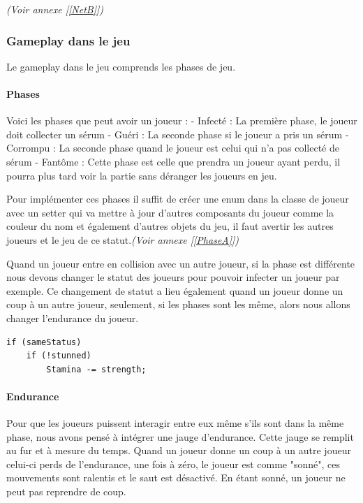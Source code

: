 \documentclass{article}
\begin{document}
\emph{(Voir annexe [\ref{NetB}])}

\newpage
\subsubsection{Gameplay dans le jeu}

Le gameplay dans le jeu comprends les phases de jeu.

\paragraph{Phases}

Voici les phases que peut avoir un joueur :
- Infecté : La première phase, le joueur doit collecter un sérum
- Guéri : La seconde phase si le joueur a pris un sérum
- Corrompu : La seconde phase quand le joueur est celui qui n'a pas collecté de sérum
- Fantôme : Cette phase est celle que prendra un joueur ayant perdu, il pourra plus tard voir la partie sans déranger les joueurs en jeu.

Pour implémenter ces phases il suffit de créer une enum dans la classe de joueur avec un setter qui va mettre à jour d'autres composants du joueur comme la couleur du nom et également d'autres objets du jeu, il faut avertir les autres joueurs et le jeu de ce statut.\emph{(Voir annexe [\ref{PhaseA}])}

Quand un joueur entre en collision avec un autre joueur, si la phase est différente nous devons changer le statut des joueurs pour pouvoir infecter un joueur par exemple. Ce changement de statut a lieu également quand un joueur donne un coup à un autre joueur, seulement, si les phases sont les même, alors nous allons changer l'endurance du joueur.

\begin{lstlisting}
if (sameStatus)
    if (!stunned)
        Stamina -= strength;
\end{lstlisting}

\paragraph{Endurance}

Pour que les joueurs puissent interagir entre eux même s'ils sont dans la même phase, nous avons pensé à intégrer une jauge d'endurance. Cette jauge se remplit au fur et à mesure du temps. Quand un joueur donne un coup à un autre joueur celui-ci perds de l'endurance, une fois à zéro, le joueur est comme "sonné", ces mouvements sont ralentis et le saut est désactivé. En étant sonné, un joueur ne peut pas reprendre de coup.
\end{document}
